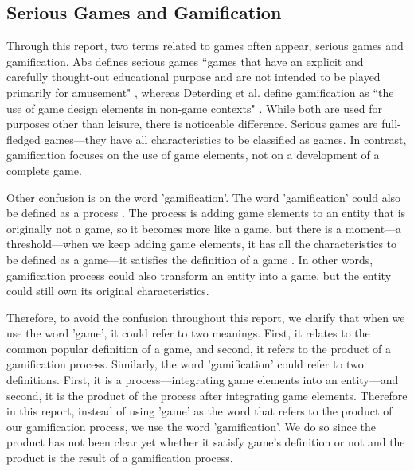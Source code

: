 \documentclass[12pt, a4paper]{report}
\begin{document}
\subsection{Serious Games and Gamification}
Through this report, two terms related to games often appear, serious games and gamification. Abs defines serious games ``games that have an explicit and carefully thought-out educational purpose and are not intended to be played primarily for amusement" \cite{abt1987serious}, whereas Deterding et al. define gamification as ``the use of game design elements in non-game contexts" \cite{deterding2011game}. While both are used for purposes other than leisure, there is noticeable difference. Serious games are full-fledged games---they have all characteristics to be classified as games. In contrast, gamification focuses on the use of game elements, not on a development of a complete game. 

Other confusion is on the word 'gamification'. The word 'gamification' could also be defined as a process \cite{werbach2014re}. The process is adding game elements to an entity that is originally not a game, so it becomes more like a game, but there is a moment---a threshold---when we keep adding game elements, it has all the characteristics to be defined as a game---it satisfies the definition of a game \cite{yohannis2014defining}. In other words, gamification process could also transform an entity into a game, but the entity could still own its original characteristics. 

Therefore, to avoid the confusion throughout this report, we clarify that when we use the word 'game', it could refer to two meanings. First, it relates to the common popular definition of a game, and second, it refers to the product of a gamification process. Similarly, the word 'gamification' could refer to two definitions. First, it is a process---integrating game elements into an entity---and second, it is the product of the process after integrating game elements. Therefore in this report, instead of using 'game' as the word that refers to the product of our gamification process, we use the word 'gamification'. We do so since the product has not been clear yet whether it satisfy game's definition or not and the product is the result of a gamification process.   
\end{document}
